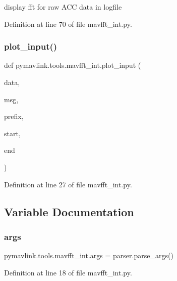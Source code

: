 \begin{DoxyVerb}display fft for raw ACC data in logfile\end{DoxyVerb}
 

Definition at line 70 of file mavfft\+\_\+int.\+py.

\mbox{\label{namespacepymavlink_1_1tools_1_1mavfft__int_ad676e5d5d87b9d552609c8379fe67870}} 
\subsubsection{\texorpdfstring{plot\_input()}{plot\_input()}}
{\footnotesize\ttfamily def pymavlink.\+tools.\+mavfft\+\_\+int.\+plot\+\_\+input (\begin{DoxyParamCaption}\item[{}]{data,  }\item[{}]{msg,  }\item[{}]{prefix,  }\item[{}]{start,  }\item[{}]{end }\end{DoxyParamCaption})}



Definition at line 27 of file mavfft\+\_\+int.\+py.



\subsection{Variable Documentation}
\mbox{\label{namespacepymavlink_1_1tools_1_1mavfft__int_a1096c19d6b3e2cd4071407b56498c6ac}} 
\subsubsection{\texorpdfstring{args}{args}}
{\footnotesize\ttfamily pymavlink.\+tools.\+mavfft\+\_\+int.\+args = parser.\+parse\+\_\+args()}



Definition at line 18 of file mavfft\+\_\+int.\+py.

